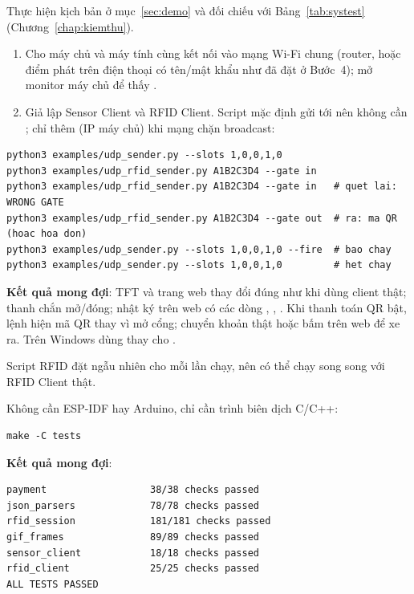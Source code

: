Thực hiện kịch bản ở mục~\ref{sec:demo} và đối chiếu với Bảng~\ref{tab:systest}
(Chương~\ref{chap:kiemthu}).

\begin{enumerate}
  \item Cho máy chủ và máy tính cùng kết nối vào mạng Wi-Fi chung (router, hoặc điểm phát
        trên điện thoại có tên/mật khẩu như đã đặt ở Bước~4); mở monitor máy chủ để
        thấy .
  \item Giả lập Sensor Client và RFID Client. Script mặc định gửi tới
         nên không cần ; chỉ thêm 
        (IP máy chủ) khi mạng chặn broadcast:
\end{enumerate}
\begin{lstlisting}[style=shell]
python3 examples/udp_sender.py --slots 1,0,0,1,0
python3 examples/udp_rfid_sender.py A1B2C3D4 --gate in
python3 examples/udp_rfid_sender.py A1B2C3D4 --gate in   # quet lai: WRONG GATE
python3 examples/udp_rfid_sender.py A1B2C3D4 --gate out  # ra: ma QR (hoac hoa don)
python3 examples/udp_sender.py --slots 1,0,0,1,0 --fire  # bao chay
python3 examples/udp_sender.py --slots 1,0,0,1,0         # het chay
\end{lstlisting}
\textbf{Kết quả mong đợi}: TFT và trang web thay đổi đúng như khi dùng client thật;
thanh chắn mở/đóng; nhật ký trên web có các dòng , ,
. Khi thanh toán QR bật, lệnh  hiện mã QR thay vì mở cổng;
chuyển khoản thật hoặc bấm  trên web để xe ra. Trên Windows dùng
 thay cho .

Script RFID đặt  ngẫu nhiên cho mỗi lần chạy, nên có thể chạy song song với
RFID Client thật.

Không cần ESP-IDF hay Arduino, chỉ cần trình biên dịch C/C++:
\begin{lstlisting}[style=shell]
make -C tests
\end{lstlisting}
\textbf{Kết quả mong đợi}:
\begin{lstlisting}[language={},numbers=none]
payment                  38/38 checks passed
json_parsers             78/78 checks passed
rfid_session             181/181 checks passed
gif_frames               89/89 checks passed
sensor_client            18/18 checks passed
rfid_client              25/25 checks passed
ALL TESTS PASSED
\end{lstlisting}

